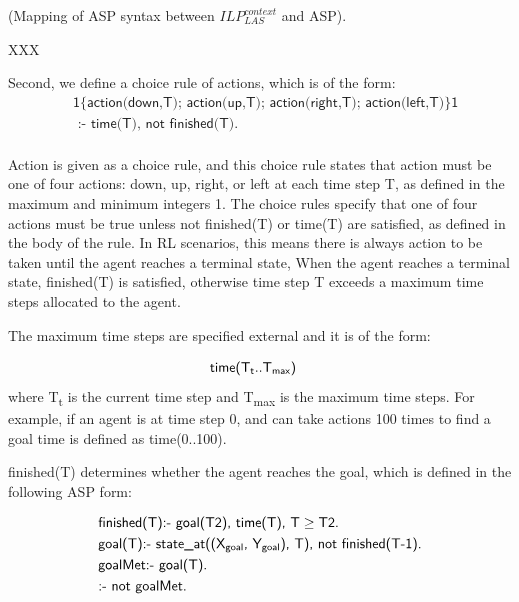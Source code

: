 \begin{examp} \normalfont (Mapping of ASP syntax between $ILP_{LAS}^{context}$ and ASP).

XXX
\end{examp}

Second, we define a choice rule of actions, which is of the form:
\begin{equation}\label{eq:choice_rule}
\begin{split}
&\textsf{1\{action(down,T); action(up,T); action(right,T); action(left,T)\}1} \\
&\textsf{ :- time(T), not finished(T).}\\
\end{split}
\end{equation}

Action is given as a choice rule, and this choice rule states that action must be one of four actions: \textsf{down}, \textsf{up}, \textsf{right}, or \textsf{left}
at each time step T, as defined in the maximum and minimum integers 1.
The choice rules specify that one of four actions must be true unless \textsf{not finished(T)} or \textsf{time(T)} are satisfied, as defined in the body of the rule.
In RL scenarios, this means there is always action to be taken until the agent reaches a terminal state, 
When the agent reaches a terminal state, \textsf{finished(T)} is satisfied, otherwise time step T exceeds a maximum time steps allocated to the agent.

The maximum time steps are specified external and it is of the form:

\begin{equation}
\begin{split}
&\textsf{time(T\textsubscript{t}..T\textsubscript{max})}
\end{split}
\end{equation}
where T\textsubscript{t} is the current time step and T\textsubscript{max} is the maximum time steps.
For example, if an agent is at time step 0, and can take actions 100 times to find a goal time is defined as \textsf{time(0..100)}.

\textsf{finished(T)} determines whether the agent reaches the goal, which is defined in the following ASP form:

\begin{equation}\label{eq:asp_goal}
\begin{split}
&\textsf{finished(T):- goal(T2), time(T), T} \geq \textsf{T2.}\\
&\textsf{goal(T):- state\_at((X\textsubscript{goal}, Y\textsubscript{goal}), T), not finished(T-1).}\\
&\textsf{goalMet:- goal(T).}\\
&\textsf{:- not goalMet.}
\end{split}
\end{equation}


